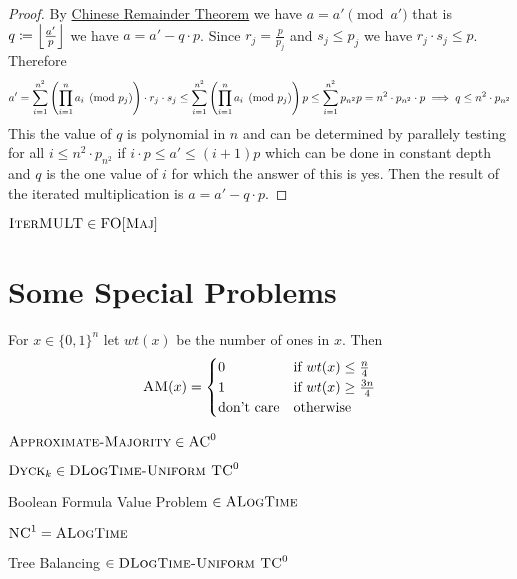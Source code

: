 \begin{proof}
	By \hyperref[crt]{Chinese Remainder Theorem} we have $a=a'\pmod{a'}$ that is $q\coloneqq \left\lfloor \frac{a'}{p}\right\rfloor$ we have $a=a'-q\cdot p$. Since $r_j=\frac{p}{p_j}$ and $s_j\leq p_j$ we have $r_j\cdot s_j\leq p$. Therefore $$a'= \sum_{i=1}^{n^2}\left( \prod\limits_{i=1}^n a_i\pmod{p_j} \right)\cdot r_j\cdot s_j\leq  \sum_{i=1}^{n^2}\left( \prod\limits_{i=1}^n a_i\pmod{p_j} \right)p\leq  \sum_{i=1}^{n^2}p_{n^2}p=n^2\cdot p_{n^2}\cdot p\implies q\leq n^2\cdot p_{n^2}$$ This the value of $q$ is  polynomial in $n$ and can be determined by parallely testing for all $i\leq n^2\cdot p_{n^2}$ if $i\cdot p\leq a'\leq (i+1)p$ which can be done in constant depth and $q$ is the one value of $i$ for which the answer of this is yes. Then the result of the iterated multiplication is $a=a'-q\cdot p$.
\end{proof}
\begin{theorem}
	$\textsc{IterMULT}\in \textsc{FO}[\textsc{Maj}]$
\end{theorem}
\section{Some Special Problems}
\begin{definition}
	For $x\in \{0,1\}^n$ let $wt(x)$ be the number of ones in $x$.  Then $$\textsc{AM}(x)=\begin{cases}
		0                 & \text{if } wt(x)\leq \frac{n}{4} \\
		1                 & \text{if } wt(x)\geq \frac{3n}4  \\
		\text{don't care} & \text{otherwise}
	\end{cases}$$
\end{definition}
\begin{theorem}
	$\textsc{Approximate-Majority}\in \textsc{AC}^0$
\end{theorem}

\begin{theorem}
	$\textsc{Dyck}_k\in \textsc{DLogTime-Uniform TC}^0$
\end{theorem}

\begin{theorem}
	Boolean Formula Value Problem $\in \textsc{ALogTime}$
\end{theorem}
\begin{corollary}
	$\textsc{NC}^1=\textsc{ALogTime}$
\end{corollary}
\begin{theorem}
	Tree Balancing $\in \textsc{DLogTime-Uniform TC}^0$
\end{theorem}